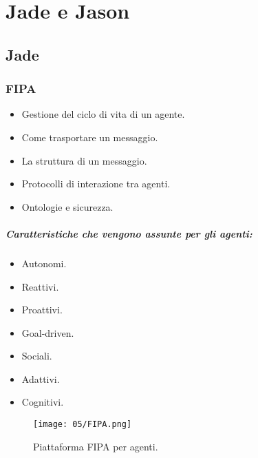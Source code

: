 \chapter{Jade e Jason}

\section{Jade}

\subsection{FIPA}



\begin{itemize}
  \item Gestione del ciclo di vita di un agente. 
  \item Come trasportare un messaggio. 
  \item La struttura di un messaggio. 
  \item Protocolli di interazione tra agenti. 
  \item Ontologie e sicurezza.
\end{itemize}


\paragraph{Caratteristiche che vengono assunte per gli agenti:}

\begin{itemize}
  \item Autonomi. 
  \item Reattivi. 
  \item Proattivi. 
  \item Goal-driven. 
  \item Sociali. 
  \item Adattivi. 
  \item Cognitivi.
\end{itemize}

\begin{figure}[!h]
    \centering
    \texttt{[image: 05/FIPA.png]}
  \caption{Piattaforma FIPA per agenti.}
\end{figure}

